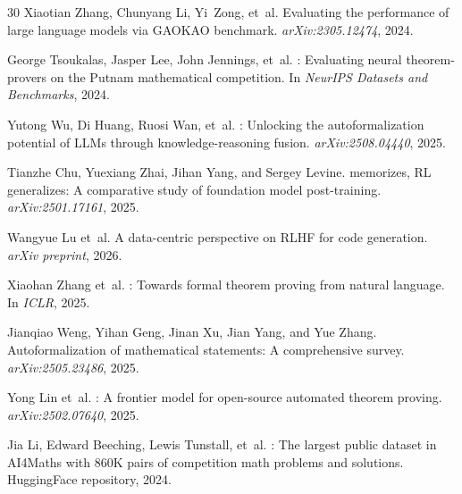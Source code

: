 \documentclass[11pt,a4paper]{article}
\begin{document}
\begin{thebibliography}{30}
Xiaotian Zhang, Chunyang Li, Yi~Zong, et~al.
\newblock Evaluating the performance of large language models via {GAOKAO} benchmark.
\newblock \emph{arXiv:2305.12474}, 2024.

George Tsoukalas, Jasper Lee, John Jennings, et~al.
: Evaluating neural theorem-provers on the {P}utnam mathematical competition.
\newblock In \emph{NeurIPS Datasets and Benchmarks}, 2024.

Yutong Wu, Di Huang, Ruosi Wan, et~al.
: Unlocking the autoformalization potential of {LLMs} through knowledge-reasoning fusion.
\newblock \emph{arXiv:2508.04440}, 2025.

Tianzhe Chu, Yuexiang Zhai, Jihan Yang, and Sergey Levine.
 memorizes, {RL} generalizes: A comparative study of foundation model post-training.
\newblock \emph{arXiv:2501.17161}, 2025.

Wangyue Lu et~al.
\newblock A data-centric perspective on {RLHF} for code generation.
\newblock \emph{arXiv preprint}, 2026.

Xiaohan Zhang et~al.
: Towards formal theorem proving from natural language.
\newblock In \emph{ICLR}, 2025.

Jianqiao Weng, Yihan Geng, Jinan Xu, Jian Yang, and Yue Zhang.
\newblock Autoformalization of mathematical statements: A comprehensive survey.
\newblock \emph{arXiv:2505.23486}, 2025.

Yong Lin et~al.
: A frontier model for open-source automated theorem proving.
\newblock \emph{arXiv:2502.07640}, 2025.

Jia Li, Edward Beeching, Lewis Tunstall, et~al.
: The largest public dataset in {AI4Maths} with 860K pairs of competition math problems and solutions.
\newblock HuggingFace repository, 2024.

\end{thebibliography}

\appendix
\end{document}
